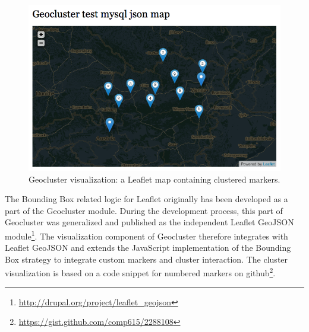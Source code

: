 \begin{figure}[h]
  \begin{center}
    \includegraphics[width=1\textwidth]{figures/geocluster_visualization.png}
    \caption{Geocluster visualization: a Leaflet map containing clustered markers.}
    \label{fig:geocluster-visualiation}
  \end{center}
\end{figure}


The Bounding Box related logic for Leaflet originally has been developed as a part of the Geocluster module. During the development process, this part of Geocluster was generalized and published as the independent Leaflet GeoJSON module\footnote{\url{http://drupal.org/project/leaflet_geojson}}. The visualization component of Geocluster therefore integrates with Leaflet GeoJSON and extends the JavaScript implementation of the Bounding Box strategy to integrate custom markers and cluster interaction. The cluster visualization is based on a code snippet for numbered markers on github\footnote{\url{https://gist.github.com/comp615/2288108}}.